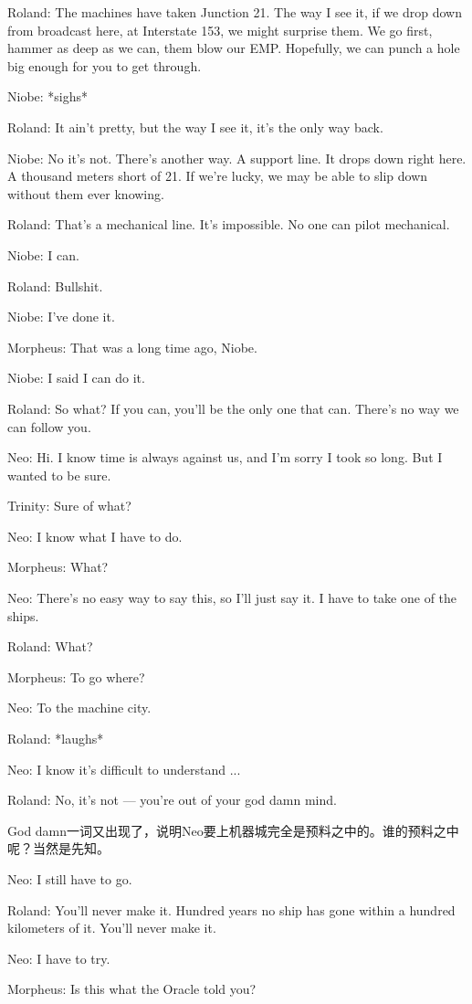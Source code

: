 \documentclass[UTF8]{ctexart}
\newenvironment{myquote}{\color{green} \setlength{\leftskip}{6em} \setlength{\rightskip}{4em} \setlength{\parindent}{-2em}}{\par}
\begin{document}
\begin{myquote}
Roland: The machines have taken Junction 21. The way I see it, if we drop down from broadcast here, at Interstate 153, we might surprise them. We go first, hammer as deep as we can, them blow our EMP. Hopefully, we can punch a hole big enough for you to get through.

Niobe: *sighs*

Roland: It ain't pretty, but the way I see it, it's the only way back.

Niobe: No it's not. There's another way. A support line. It drops down right here. A thousand meters short of 21. If we're lucky, we may be able to slip down without them ever knowing.

Roland: That's a mechanical line. It's impossible. No one can pilot mechanical.

Niobe: I can.

Roland: Bullshit.

Niobe: I've done it.

Morpheus: That was a long time ago, Niobe.

Niobe: I said I can do it.

Roland: So what? If you can, you'll be the only one that can. There's no way we can follow you.

Neo: Hi. I know time is always against us, and I'm sorry I took so long. But I wanted to be sure.

Trinity: Sure of what?

Neo: I know what I have to do.

Morpheus: What?

Neo: There's no easy way to say this, so I'll just say it. I have to take one of the ships.

Roland: What?

Morpheus: To go where?

Neo: To the machine city.

Roland: *laughs*

Neo: I know it's difficult to understand ...

Roland: No, it's not --- you're out of your god damn mind.
\end{myquote}

God damn一词又出现了，说明Neo要上机器城完全是预料之中的。谁的预料之中呢？当然是先知。

\begin{myquote}
Neo: I still have to go.

Roland: You'll never make it. Hundred years no ship has gone within a hundred kilometers of it. You'll never make it.

Neo: I have to try.

Morpheus: Is this what the Oracle told you?
\end{myquote}
\end{document}
